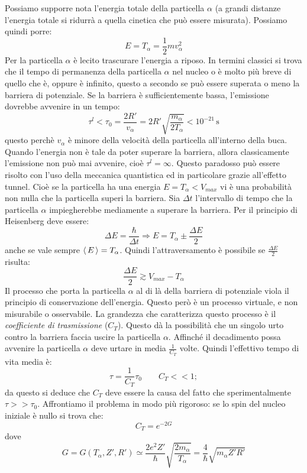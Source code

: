 Possiamo supporre nota l'energia totale della particella $\alpha$ (a grandi
distanze l'energia totale si ridurrà a quella cinetica che può essere misurata).
Possiamo quindi porre:
\[
E=T_{\alpha}=\frac{1}{2}mv_{\alpha}^2
\]
Per la particella $\alpha$ è lecito trascurare l'energia a riposo. In termini
classici si trova che il tempo di permanenza della particella $\alpha$ nel
nucleo o è molto più breve di quello che è, oppure è infinito, questo a secondo
se può essere superata o meno la barriera di potenziale. Se la barriera è
sufficientemente bassa, l'emissione dovrebbe avvenire in un tempo:
\begin{equation}
\tau^{l}<\tau_0=\frac{2R'}{v_{\alpha}}=2R'\sqrt{\frac{m_{\alpha}}{2T_{\alpha}}}<10^{-21}\,\si{\second}
\end{equation}
questo perchè $v_{\alpha}$ è minore della velocità della particella all'interno
della buca. Quando l'energia non è tale da poter superare la barriera, allora
classicamente l'emissione non può mai avvenire, cioè $\tau^{l}=\infty$. Questo
paradosso può essere risolto con l'uso della meccanica quantistica ed in
particolare grazie all'effetto tunnel. Cioè se la particella ha una energia
$E=T_{\alpha}<V_{max}$ vi è una probabilità non nulla che la particella superi
la barriera. Sia $\Delta t$ l'intervallo di tempo che la particella $\alpha$
impiegherebbe mediamente a superare la barriera. Per il principio di Heisenberg
deve essere:
\[
\Delta E=\frac{\hbar}{\Delta t}\Rightarrow E=T_{\alpha}\pm\frac{\Delta E}{2}
\]
anche se vale sempre $\left\langle\, E \,\right\rangle=T_{\alpha}$. Quindi l'attraversamento è possibile se
$\frac{\Delta E}{2}$ risulta:
\[
\frac{\Delta E}{2}\gtrsim V_{max}-T_{\alpha}
\]
Il processo che porta la particella $\alpha$ al di là della barriera di
potenziale viola il principio di conservazione dell'energia. Questo però è un
processo virtuale, e non misurabile o osservabile. La grandezza che caratterizza
questo processo è il \textit{coefficiente di trasmissione} ($C_T$). Questo dà la
possibilità che un singolo urto contro la barriera faccia uscire la particella
$\alpha$. Affinché il decadimento possa avvenire la particella $\alpha$ deve
urtare in media $\frac{1}{C_T}$ volte. Quindi l'effettivo tempo di vita media è:
\[
\tau=\frac{1}{C_T}\tau_0\qquad C_T<<1;
\]
da questo si deduce che $C_T$ deve essere la causa del fatto che
sperimentalmente $\tau>>\tau_0$. Affrontiamo il problema in modo più rigoroso:
se lo spin del nucleo
iniziale è nullo si trova che:
\[
C_T=e^{-2G}
\]
dove
\begin{equation}
G=G(T_{\alpha},Z',R')\simeq\frac{2e^2Z'}{\hbar}\sqrt{\frac{2m_{\alpha}}{T_{\alpha}}}
= \frac{4}{\hslash}\sqrt{m_\alpha Z'R'}
\end{equation}

